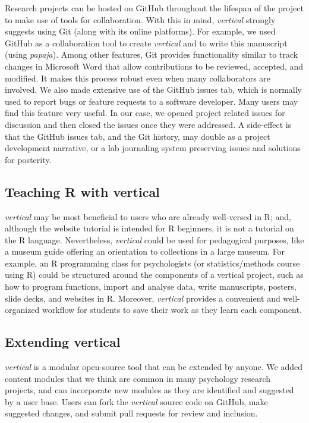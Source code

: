 \documentclass[
  english,
  jou,floatsintext]{apa6}
\begin{document}
Research projects can be hosted on GitHub throughout the lifespan of the project to make use of tools for collaboration. With this in mind, \emph{vertical} strongly suggests using Git (along with its online platforms). For example, we used GitHub as a collaboration tool to create \emph{vertical} and to write this manuscript (using \emph{papaja}). Among other features, Git provides functionality similar to track changes in Microsoft Word that allow contributions to be reviewed, accepted, and modified. It makes this process robust even when many collaborators are involved. We also made extensive use of the GitHub issues tab, which is normally used to report bugs or feature requests to a software developer. Many users may find this feature very useful. In our case, we opened project related issues for discussion and then closed the issues once they were addressed. A side-effect is that the GitHub issues tab, and the Git history, may double as a project development narrative, or a lab journaling system preserving issues and solutions for posterity.

\hypertarget{teaching-r-with-vertical}{%
\subsection{Teaching R with vertical}\label{teaching-r-with-vertical}}

\emph{vertical} may be most beneficial to users who are already well-versed in R; and, although the website tutorial is intended for R beginners, it is not a tutorial on the R language. Nevertheless, \emph{vertical} could be used for pedagogical purposes, like a museum guide offering an orientation to collections in a large museum. For example, an R programming class for psychologists (or statistics/methods course using R) could be structured around the components of a vertical project, such as how to program functions, import and analyse data, write manuscripts, posters, slide decks, and websites in R. Moreover, \emph{vertical} provides a convenient and well-organized workflow for students to save their work as they learn each component.

\hypertarget{extending-vertical}{%
\subsection{Extending vertical}\label{extending-vertical}}

\emph{vertical} is a modular open-source tool that can be extended by anyone. We added content modules that we think are common in many psychology research projects, and can incorporate new modules as they are identified and suggested by a user base. Users can fork the \emph{vertical} source code on GitHub, make suggested changes, and submit pull requests for review and inclusion.
\end{document}
